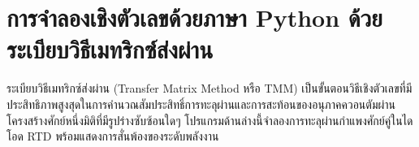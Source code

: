 \section{การจำลองเชิงตัวเลขด้วยภาษา Python ด้วยระเบียบวิธีเมทริกซ์ส่งผ่าน}
\label{sec_python_tmm}

ระเบียบวิธีเมทริกซ์ส่งผ่าน (Transfer Matrix Method หรือ TMM) เป็นขั้นตอนวิธีเชิงตัวเลขที่มีประสิทธิภาพสูงสุดในการคำนวณสัมประสิทธิ์การทะลุผ่านและการสะท้อนของอนุภาคควอนตัมผ่านโครงสร้างศักย์หนึ่งมิติที่มีรูปร่างซับซ้อนใดๆ โปรแกรมด้านล่างนี้จำลองการทะลุผ่านกำแพงศักย์คู่ในไดโอด RTD พร้อมแสดงการสั่นพ้องของระดับพลังงาน

